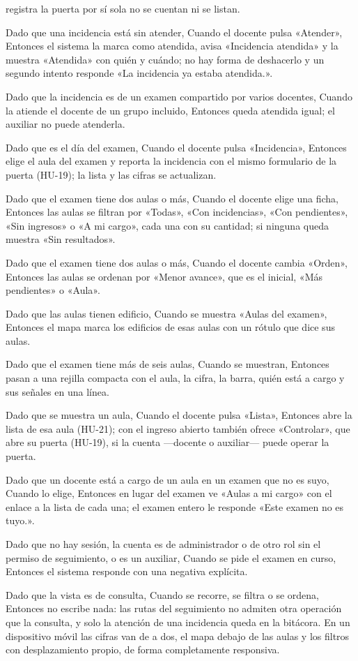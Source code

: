 {      registra la puerta por sí sola no se cuentan ni se listan.
\item Dado que una incidencia está sin atender, Cuando el docente pulsa «Atender»,
      Entonces el sistema la marca como atendida, avisa «Incidencia atendida» y la muestra
      «Atendida» con quién y cuándo; no hay forma de deshacerlo y un segundo intento
      responde «La incidencia ya estaba atendida.».
\item Dado que la incidencia es de un examen compartido por varios docentes, Cuando la
      atiende el docente de un grupo incluido, Entonces queda atendida igual; el auxiliar
      no puede atenderla.
\item Dado que es el día del examen, Cuando el docente pulsa «Incidencia», Entonces elige
      el aula del examen y reporta la incidencia con el mismo formulario de la puerta
      (HU-19); la lista y las cifras se actualizan.
\item Dado que el examen tiene dos aulas o más, Cuando el docente elige una ficha,
      Entonces las aulas se filtran por «Todas», «Con incidencias», «Con pendientes»,
      «Sin ingresos» o «A mi cargo», cada una con su cantidad; si ninguna queda muestra
      «Sin resultados».
\item Dado que el examen tiene dos aulas o más, Cuando el docente cambia «Orden»,
      Entonces las aulas se ordenan por «Menor avance», que es el inicial, «Más
      pendientes» o «Aula».
\item Dado que las aulas tienen edificio, Cuando se muestra «Aulas del examen», Entonces
      el mapa marca los edificios de esas aulas con un rótulo que dice sus aulas.
\item Dado que el examen tiene más de seis aulas, Cuando se muestran, Entonces pasan a
      una rejilla compacta con el aula, la cifra, la barra, quién está a cargo y sus
      señales en una línea.
\item Dado que se muestra un aula, Cuando el docente pulsa «Lista», Entonces abre la lista
      de esa aula (HU-21); con el ingreso abierto también ofrece «Controlar», que abre su
      puerta (HU-19), si la cuenta ---docente o auxiliar--- puede operar la puerta.
\item Dado que un docente está a cargo de un aula en un examen que no es suyo, Cuando lo
      elige, Entonces en lugar del examen ve «Aulas a mi cargo» con el enlace a la lista de
      cada una; el examen entero le responde «Este examen no es tuyo.».
\item Dado que no hay sesión, la cuenta es de administrador o de otro rol sin el permiso
      de seguimiento, o es un auxiliar, Cuando se pide el examen en curso, Entonces el
      sistema responde con una negativa explícita.
\item Dado que la vista es de consulta, Cuando se recorre, se filtra o se ordena, Entonces
      no escribe nada: las rutas del seguimiento no admiten otra operación que la consulta,
      y solo la atención de una incidencia queda en la bitácora. En un dispositivo móvil
      las cifras van de a dos, el mapa debajo de las aulas y los filtros con desplazamiento
      propio, de forma completamente responsiva.}


